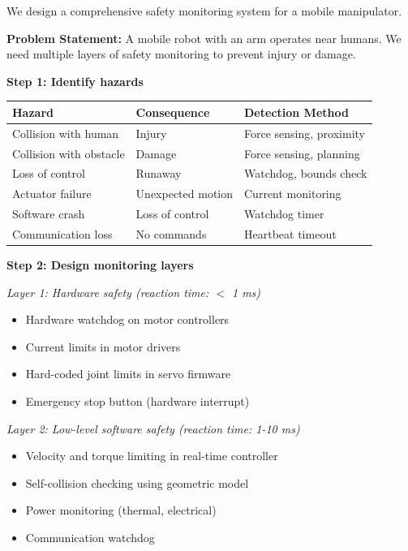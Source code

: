 \begin{example}
\label{ex:safety_monitoring}
We design a comprehensive safety monitoring system for a mobile manipulator.

\textbf{Problem Statement:}
A mobile robot with an arm operates near humans. We need multiple layers of safety monitoring to prevent injury or damage.

\textbf{Step 1: Identify hazards}

\begin{center}
\begin{tabular}{lll}
\toprule
\textbf{Hazard} & \textbf{Consequence} & \textbf{Detection Method} \\
\midrule
Collision with human & Injury & Force sensing, proximity \\
Collision with obstacle & Damage & Force sensing, planning \\
Loss of control & Runaway & Watchdog, bounds check \\
Actuator failure & Unexpected motion & Current monitoring \\
Software crash & Loss of control & Watchdog timer \\
Communication loss & No commands & Heartbeat timeout \\
\bottomrule
\end{tabular}
\end{center}

\textbf{Step 2: Design monitoring layers}

\textit{Layer 1: Hardware safety (reaction time: $<$ 1 ms)}
\begin{itemize}
    \item Hardware watchdog on motor controllers
    \item Current limits in motor drivers
    \item Hard-coded joint limits in servo firmware
    \item Emergency stop button (hardware interrupt)
\end{itemize}

\textit{Layer 2: Low-level software safety (reaction time: 1-10 ms)}
\begin{itemize}
    \item Velocity and torque limiting in real-time controller
    \item Self-collision checking using geometric model
    \item Power monitoring (thermal, electrical)
    \item Communication watchdog
\end{itemize}


\end{example}
